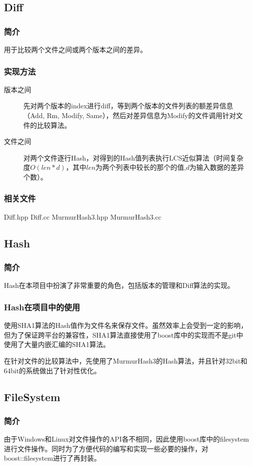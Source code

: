 \documentclass[11pt, a4paper, UTF8]{ctexart}
\begin{document}
\subsection{Diff}
\subsubsection{简介}
用于比较两个文件之间或两个版本之间的差异。
\subsubsection{实现方法}
\begin{description}
	\item[版本之间] 先对两个版本的index进行diff，等到两个版本的文件列表的额差异信息（Add, Rm, Modify, Same），然后对差异信息为Modify的文件调用针对文件的比较算法。
	\item[文件之间] 对两个文件逐行Hash，对得到的Hash值列表执行LCS近似算法（时间复杂度$O(len*d)$，其中$len$为两个列表中较长的那个的值,$d$为输入数据的差异个数）。
\end{description}
\subsubsection{相关文件}
Diff.hpp Diff.cc MurmurHash3.hpp MurmurHash3.cc

\subsection{Hash}
\subsubsection{简介}
Hash在本项目中扮演了非常重要的角色，包括版本的管理和Diff算法的实现。
\subsubsection{Hash在项目中的使用}
使用SHA1算法的Hash值作为文件名来保存文件。虽然效率上会受到一定的影响，但为了保证跨平台的兼容性，SHA1算法直接使用了boost库中的实现而不是git中使用了大量内嵌汇编的SHA1算法。

在针对文件的比较算法中，先使用了MurmurHash3的Hash算法，并且针对32bit和64bit的系统做出了针对性优化。

\subsection{FileSystem}
\subsubsection{简介}
由于Windows和Linux对文件操作的API各不相同，因此使用boost库中的filesystem进行文件操作。同时为了方便代码的编写和实现一些必要的操作，对boost::filesystem进行了再封装。
\end{document}
